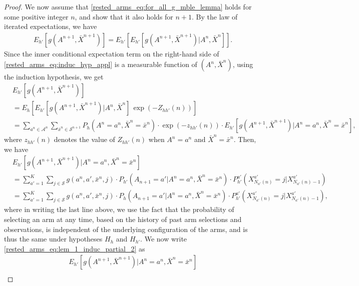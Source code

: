 \begin{proof}
We now assume that \eqref{rested_arms_eq:for_all_g_mble_lemma} holds for some positive integer $n$, and show that it also holds for $n+1$. By the law of iterated expectations, we have
\begingroup\allowdisplaybreaks\begin{align}
&E_{h'}[g(A^{n+1},\bar{X}^{n+1})]=E_{h'}\left[E_{h'}\left[g(A^{n+1},\bar{X}^{n+1})|A^n,\bar{X}^n\right]\right].\label{rested_arms_eq:induc_hyp_appl}
\end{align}\endgroup
Since the inner conditional expectation term on the right-hand side of \eqref{rested_arms_eq:induc_hyp_appl} is a measurable function of $(A^n,\bar{X}^n)$, using the induction hypothesis, we get
\begingroup\allowdisplaybreaks\begin{align}
& E_{h'}[g(A^{n+1},\bar{X}^{n+1})]\nonumber\\
& =E_{h}\left[E_{h'}\left[g(A^{n+1},\bar{X}^{n+1})|A^n,\bar{X}^n\right]\,\exp(-Z_{hh'}(n))\right]\nonumber\\
&=\sum\limits_{a^n\in\mathcal{A}^n}\sum\limits_{\bar{x}^n\in \mathcal{S}^{n+1}}P_h(A^n=a^n,\bar{X}^n=\bar{x}^n)\cdot \exp(-z_{hh'}(n))\cdot E_{h'}[g(A^{n+1},\bar{X}^{n+1})|A^n=a^n,\bar{X}^n=\bar{x}^n]\label{rested_arms_eq:lem_1_induc_partial_1},
\end{align}\endgroup
where $z_{hh'}(n)$ denotes the value of $Z_{hh'}(n)$ when $A^n=a^n$ and $\bar{X}^n=\bar{x}^n$. Then, we have
\begingroup\allowdisplaybreaks\begin{align}
&E_{h'}[g(A^{n+1},\bar{X}^{n+1})|A^n=a^n,\bar{X}^n=\bar{x}^n]\nonumber\\
&=\sum\limits_{a'=1}^{K}\sum\limits_{j\in\mathcal{S}}g(a^n,a',\bar{x}^n,j)\cdot P_{h'}(A_{n+1}=a'|A^n=a^n,\bar{X}^n=\bar{x}^n)
\cdot P_{h'}^{a'}(X_{N_{a'}(n)}^{a'}=j|X_{N_{a'}(n)-1}^{a'})\nonumber\\
&=\sum\limits_{a'=1}^{K}\sum\limits_{j\in\mathcal{S}}g(a^n,a',\bar{x}^n,j)\cdot P_{h}(A_{n+1}=a'|A^n=a^n,\bar{X}^n=\bar{x}^n)
\cdot P_{h'}^{a'}(X_{N_{a'}(n)}^{a'}=j|X_{N_{a'}(n)-1}^{a'}),\label{rested_arms_eq:lem_1_induc_partial_2}
\end{align}\endgroup
where in writing the last line above, we use the fact that the probability of selecting an arm at any time, based on the history of past arm selections and observations, is independent of the underlying configuration of the arms, and is thus the same under hypotheses $H_h$ and $H_{h'}$. We now write \eqref{rested_arms_eq:lem_1_induc_partial_2} as
\begingroup\allowdisplaybreaks\begin{align}
&E_{h'}[g(A^{n+1},\bar{X}^{n+1})|A^n=a^n,\bar{X}^n=\bar{x}^n]\nonumber\\

\end{align}
\end{proof}
